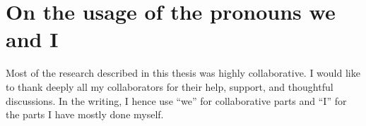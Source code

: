 \section*{On the usage of the pronouns we and I}

Most of the research described in this thesis was highly collaborative.
I would like to thank deeply all my collaborators for their help, support, and thoughtful discussions.
In the writing, I hence use ``we'' for collaborative parts and ``I'' for the parts I have mostly done myself.






















